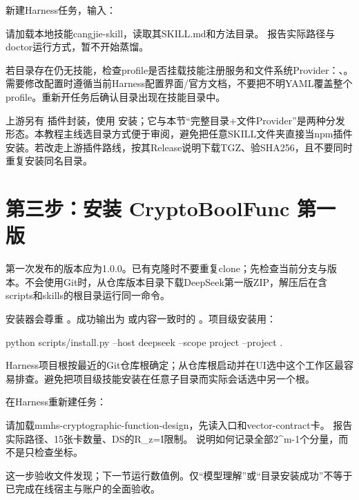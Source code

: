 新建Harness任务，输入：
\begin{code}
请加载本地技能cangjie-skill，读取其SKILL.md和方法目录。
报告实际路径与doctor运行方式，暂不开始蒸馏。
\end{code}
若目录存在仍无技能，检查profile是否挂载技能注册服务和文件系统Provider：、。需要修改配置时遵循当前Harness配置界面/官方文档，不要把不明YAML覆盖整个profile。重新开任务后确认目录出现在技能目录中。

上游另有  插件封装，使用  安装；它与本节“完整目录+文件Provider”是两种分发形态。本教程主线选目录方式便于审阅，避免把任意SKILL文件夹直接当npm插件安装。若改走上游插件路线，按其Release说明下载TGZ、验SHA256，且不要同时重复安装同名目录。

\section{第三步：安装 CryptoBoolFunc 第一版}
第一次发布的版本应为1.0.0。已有克隆时不要重复clone；先检查当前分支与版本。不会使用Git时，从仓库版本目录下载DeepSeek第一版ZIP，解压后在含scripts和skills的根目录运行同一命令。

安装器会尊重 。成功输出为  或内容一致时的 。项目级安装用：
\begin{code}
python scripts/install.py --host deepseek --scope project --project .
\end{code}
Harness项目根按最近的Git仓库根确定；从仓库根启动并在UI选中这个工作区最容易排查。避免把项目级技能安装在任意子目录而实际会话选中另一个根\cite{dshskills}。

在Harness重新建任务：
\begin{code}
请加载mmhs-cryptographic-function-design，先读入口和vector-contract卡。
报告实际路径、15张卡数量、DS的R_z=I限制。
说明如何记录全部2^m-1个分量，而不是只检查坐标。
\end{code}
这一步验收文件发现；下一节运行数值例。仅“模型理解”或“目录安装成功”不等于已完成在线宿主与账户的全面验收。


